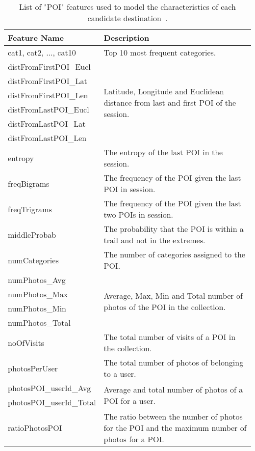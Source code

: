 \documentclass[9pt]{extarticle}
\begin{document}
\begin{table}[ht]
\caption{List of "POI" features used to model the characteristics of each candidate destination~\cite{baraglia2013learnext}.}
\centering
\begin{tabular}{l|m{}} \hline
\textbf{Feature Name}  & \textbf{Description} \\ \hline
cat1, cat2, ..., cat10 & Top 10 most frequent categories.\\ \hline
distFromFirstPOI\_Eucl & \multirow{6}{*}{Latitude, Longitude and Euclidean distance from last and first POI of the session.} \\
distFromFirstPOI\_Lat  & \\
distFromFirstPOI\_Len  & \\
distFromLastPOI\_Eucl  & \\
distFromLastPOI\_Lat   & \\
distFromLastPOI\_Len   & \\ \hline
entropy                & The entropy of the last POI in the session. \\ \hline
freqBigrams            & The frequency of the POI given the last POI in session.\\ \hline
freqTrigrams           & The frequency of the POI given the last two POIs in session. \\ \hline
middleProbab           & The probability that the POI is within a trail and not in the extremes. \\ \hline
numCategories          & The number of categories assigned to the POI. \\ \hline
numPhotos\_Avg         & \multirow{4}{*}{Average, Max, Min and Total number of photos of the POI in the collection.} \\ 
numPhotos\_Max         & \\
numPhotos\_Min         & \\
numPhotos\_Total       & \\ \hline
noOfVisits             & The total number of visits of a POI in the collection.\\ \hline
photosPerUser          & The total number of photos of belonging to a user. \\ \hline
photosPOI\_userId\_Avg   & \multirow{2}{*}{Average and total number of photos of a POI for a user.} \\
photosPOI\_userId\_Total & \\ \hline
ratioPhotosPOI           & The ratio between the number of photos for the POI and the maximum number of photos for a POI. \\ \hline

\end{tabular}
\end{table}
\end{document}
